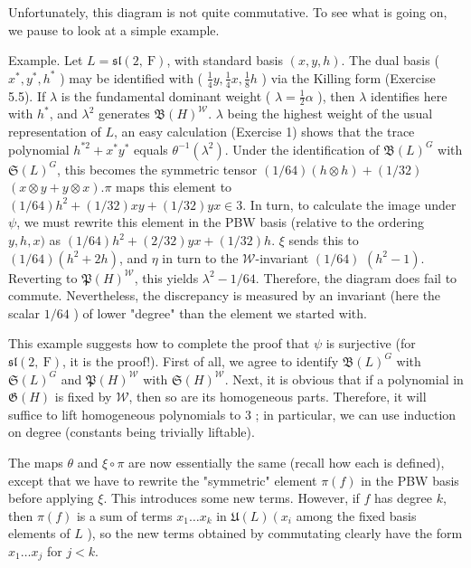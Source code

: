 \documentclass[10pt]{article}
\begin{document}
Unfortunately, this diagram is not quite commutative. To see what is going on, we pause to look at a simple example.

Example. Let $L=\mathfrak{s l}(2, \mathrm{~F})$, with standard basis $(x, y, h)$. The dual basis ( $x^{*}, y^{*}, h^{*}$ ) may be identified with ( $\frac{1}{4} y, \frac{1}{4} x, \frac{1}{8} h$ ) via the Killing form (Exercise 5.5). If $\lambda$ is the fundamental dominant weight ( $\lambda=\frac{1}{2} \alpha$ ), then $\lambda$ identifies here with $h^{*}$, and $\lambda^{2}$ generates $\mathfrak{B}(H)^{\mathscr{W}}$. $\lambda$ being the highest weight of the usual representation of $L$, an easy calculation (Exercise 1) shows that the trace polynomial $h^{* 2}+x^{*} y^{*}$ equals $\theta^{-1}\left(\lambda^{2}\right)$. Under the identification of $\mathfrak{B}(L)^{G}$ with $\mathfrak{S}(L)^{G}$, this becomes the symmetric tensor $(1 / 64)(h \otimes h)+(1 / 32)$ $(x \otimes y+y \otimes x) . \pi$ maps this element to $(1 / 64) h^{2}+(1 / 32) x y+(1 / 32) y x \in 3$. In turn, to calculate the image under $\psi$, we must rewrite this element in the PBW basis (relative to the ordering $y, h, x)$ as $(1 / 64) h^{2}+(2 / 32) y x+(1 / 32) h$. $\xi$ sends this to $(1 / 64)\left(h^{2}+2 h\right)$, and $\eta$ in turn to the $\mathscr{W}$-invariant $(1 / 64)$ $\left(h^{2}-1\right)$. Reverting to $\mathfrak{P}(H)^{\mathscr{W}}$, this yields $\lambda^{2}-1 / 64$. Therefore, the diagram does fail to commute. Nevertheless, the discrepancy is measured by an invariant (here the scalar $1 / 64$ ) of lower "degree" than the element we started with.

This example suggests how to complete the proof that $\psi$ is surjective (for $\mathfrak{s l}(2, \mathrm{~F})$, it is the proof!). First of all, we agree to identify $\mathfrak{B}(L)^{G}$ with $\mathfrak{S}(L)^{G}$ and $\mathfrak{P}(H)^{\mathscr{W}}$ with $\mathfrak{S}(H)^{\mathscr{W}}$. Next, it is obvious that if a polynomial in $\mathfrak{G}(H)$ is fixed by $\mathscr{W}$, then so are its homogeneous parts. Therefore, it will suffice to lift homogeneous polynomials to 3 ; in particular, we can use induction on degree (constants being trivially liftable).

The maps $\theta$ and $\xi \circ \pi$ are now essentially the same (recall how each is defined), except that we have to rewrite the "symmetric" element $\pi(f)$ in the PBW basis before applying $\xi$. This introduces some new terms. However, if $f$ has degree $k$, then $\pi(f)$ is a sum of terms $x_{1} \ldots x_{k}$ in $\mathfrak{U}(L)\left(x_{i}\right.$ among the fixed basis elements of $L$ ), so the new terms obtained by commutating clearly have the form $x_{1} \ldots x_{j}$ for $j<k$.
\end{document}
